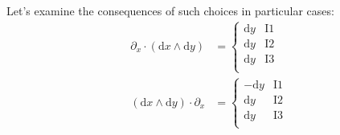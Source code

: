 \documentclass[\ifafour a4paper,12pt,\else a5paper,10pt,\fi%
onecolumn,oneside,article,%
british%
]{memoir}
\theoremstyle{remark}
\theoremstyle{innote}
\newcommand*{\de}{\partialup}%
\newcommand*{\di}{\mathrm{d}}%
\renewcommand*{\|}[1][]{\nonscript\,#1\vert\nonscript\;\mathopen{}}
\begin{document}
Let's examine the consequences of such choices in particular cases:
\begin{align}
  \label{eq:examples_choices_inner_two_x1}
 \de_{x} \cdot (\di x \land \di y)  &=
  \begin{cases}
    \di y &\text{I1}\\
    \di y &\text{I2}\\
    \di y &\text{I3}\\
  \end{cases}
  \\
  \label{eq:examples_choices_inner_two_x2}
  (\di x \land \di y) \cdot \de_{x} &=
  \begin{cases}
    -\di y &\text{I1}\\
    \di y &\text{I2}\\
    \di y &\text{I3}\\
  \end{cases}
  \\

\end{align}
\end{document}

